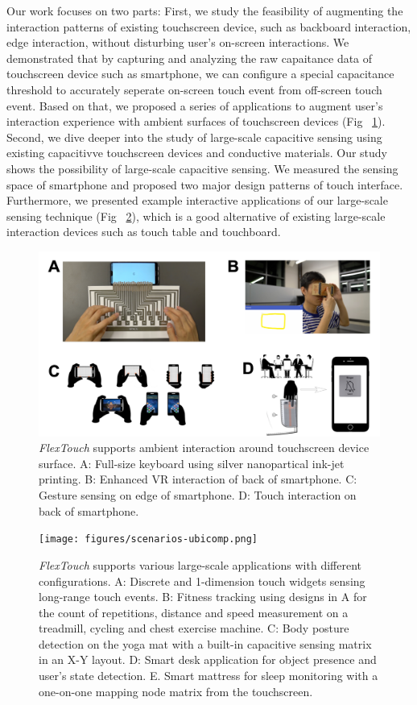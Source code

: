 Our work focuses on two parts: First, we study the feasibility of augmenting the interaction patterns of existing touchscreen device, such as backboard interaction, edge interaction, without disturbing user's on-screen interactions. We demonstrated that by capturing and analyzing the raw capaitance data of touchscreen device such as smartphone, we can configure a special capacitance threshold to accurately seperate on-screen touch event from off-screen touch event. Based on that, we proposed a series of applications to augment user's interaction experience with ambient surfaces of touchscreen devices (Fig ~\ref{fig:small-scale-scenarios}). Second, we dive deeper into the study of large-scale capacitive sensing using existing capacitivve touchscreen devices and conductive materials. Our study shows the possibility of large-scale capacitive sensing. We measured the sensing space of smartphone and proposed two major design patterns of touch interface. Furthermore, we presented example interactive applications of our large-scale sensing technique (Fig ~\ref{fig:large-scale-scenarios}), which is a good alternative of existing large-scale interaction devices such as touch table and touchboard.

\begin{figure}
    \centering
      \includegraphics[width=0.78\columnwidth]{figures/small-scale-scenarios.png}
      \setlength{\belowcaptionskip}{-8pt}
      \caption{\textit{FlexTouch} supports ambient interaction around touchscreen device surface. A: Full-size keyboard using silver nanopartical ink-jet printing. B: Enhanced VR interaction of back of smartphone. C: Gesture sensing on edge of smartphone. D: Touch interaction on back of smartphone.}
      \label{fig:small-scale-scenarios}
\end{figure}

\begin{figure}
\centering
  \texttt{[image: figures/scenarios-ubicomp.png]}
  \setlength{\belowcaptionskip}{-6pt}
  \caption{\textit{FlexTouch} supports various large-scale applications with different configurations. A: Discrete and 1-dimension touch widgets sensing long-range touch events. B: Fitness tracking using designs in A for the count of repetitions, distance and speed measurement on a treadmill, cycling and chest exercise machine. C: Body posture detection on the yoga mat with a built-in capacitive sensing matrix in an X-Y layout. D: Smart desk application for object presence and user's state detection. E. Smart mattress for sleep monitoring with a one-on-one mapping node matrix from the touchscreen.}
  \label{fig:large-scale-scenarios}
\end{figure}

